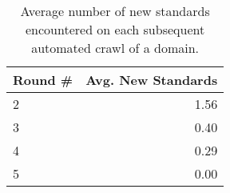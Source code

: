 \begin{table}[ht]
  \centering
  \begin{tabular}{ l r }
    \toprule
      Round \# &
      Avg. New Standards \\
    \midrule
      2 & 1.56 \\
      3 & 0.40 \\
      4 & 0.29 \\
      5 & 0.00 \\
    \bottomrule
  \end{tabular}
  \caption{Average number of new standards encountered on each subsequent automated crawl of a domain.}
  \label{fig:internal-validation-table}
\end{table}